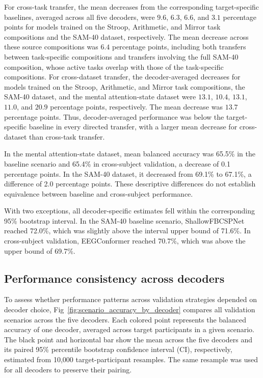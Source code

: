 \documentclass[10pt,letterpaper]{article}
\begin{document}


For cross-task transfer, the mean decreases from the corresponding
target-specific baselines, averaged across all five decoders, were $9.6$,
$6.3$, $6.6$, and $3.1$ percentage points for models trained on the Stroop, Arithmetic, and
Mirror task compositions and the SAM-40 dataset, respectively. The mean
decrease across these source compositions was $6.4$ percentage points, including
both transfers between task-specific compositions and transfers involving the
full SAM-40 composition, whose active tasks overlap with those of the
task-specific compositions. For cross-dataset
transfer, the decoder-averaged decreases for models trained on the Stroop,
Arithmetic, and Mirror task compositions, the SAM-40 dataset, and the mental
attention-state dataset were $13.1$, $10.4$, $13.1$, $11.0$, and $20.9$ percentage points,
respectively. The mean decrease was $13.7$ percentage points. Thus,
decoder-averaged performance was below the target-specific baseline in every
directed transfer, with a larger mean decrease for cross-dataset than cross-task
transfer.



In the mental attention-state dataset, mean balanced accuracy was 65.5\% in the
baseline scenario and 65.4\% in cross-subject validation, a decrease of 0.1
percentage points. In the SAM-40 dataset, it decreased from 69.1\% to 67.1\%,
a difference of 2.0 percentage points. These descriptive differences do not
establish equivalence between baseline and cross-subject performance.

With two exceptions, all decoder-specific estimates fell within the
corresponding 95\% bootstrap interval. In the SAM-40 baseline scenario,
ShallowFBCSPNet reached 72.0\%, which was slightly above the interval upper
bound of 71.6\%. In cross-subject validation, EEGConformer reached 70.7\%,
which was above the upper bound of 69.7\%.

\subsection*{Performance consistency across decoders}

To assess whether performance patterns across validation strategies depended on
decoder choice, Fig~\ref{fig:scenario_accuracy_by_decoder} compares all
validation scenarios across the five decoders. Each colored point represents
the balanced accuracy of one decoder, averaged across target participants in a
given scenario. The black point and horizontal bar show the mean
across the five decoders and its paired 95\% percentile bootstrap confidence
interval (CI), respectively, estimated from 10,000 target-participant
resamples. The same resample was used for all decoders to preserve their
pairing.
\end{document}
